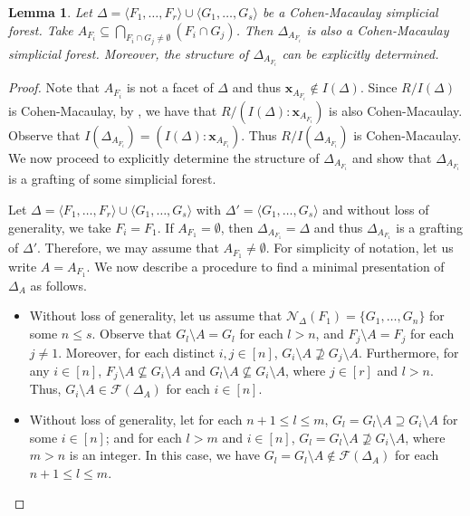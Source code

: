 \documentclass[12pt,a4paper,reqno]{amsart}
\newtheorem{lemma}[proposition]{Lemma}
\theoremstyle{definition}
\def\D{\Delta}
\def\F{\mathcal{F}}
\def\N{\mathcal{N}}
\def\l{\langle}
\def\r{\rangle}
\def\x{\mathbf x}
\begin{document}
\begin{lemma}\label{contraction CM}
    Let $\Delta=\l F_1,\ldots,F_r\r\cup\l G_1,\ldots,G_s\r$ be a Cohen-Macaulay simplicial forest. Take $A_{F_i}\subseteq \bigcap_{F_i\cap G_j\neq\emptyset}(F_i\cap G_j)$. Then $\Delta_{A_{F_i}}$ is also a Cohen-Macaulay simplicial forest. Moreover, the structure of $\D_{A_{F_i}}$ can be explicitly determined. 
\end{lemma}
\begin{proof}
Note that $A_{F_i}$ is not a facet of $\Delta$ and thus $\x_{A_{F_i}}\notin I(\Delta)$. Since $R/I(\Delta)$ is Cohen-Macaulay, by , we have that $R/(I(\D):\x_{A_{F_i}})$ is also Cohen-Macaulay. Observe that $I(\Delta_{A_{F_i}})=(I(\D):\x_{A_{F_i}})$. Thus $R/I(\Delta_{A_{F_i}})$ is Cohen-Macaulay. We now proceed to explicitly determine the structure of $\D_{A_{F_i}}$ and show that $\D_{A_{F_i}}$ is a grafting of some simplicial forest.
     
     
     Let $\Delta=\l F_1,\ldots,F_r\r\cup\l G_1,\ldots,G_s\r$ with $\Delta'=\l  G_1,\ldots,G_s\r$ and without loss of generality, we take $F_i=F_1$. If $A_{F_1}=\emptyset$, then $\Delta_{A_{F_1}}=\Delta$ and thus $\D_{A_{F_1}}$ is a grafting of $\D'$. Therefore, we may assume that $A_{F_1}\neq \emptyset$. For simplicity of notation, let us write $A=A_{F_1}$. We now describe a procedure to find a minimal presentation of $\Delta_{A}$ as follows.\par

     \begin{itemize}
         \item[$\bullet$] Without loss of generality, let us assume that $\N_{\D}(F_1)=\{G_1,\ldots,G_n\}$ for some $n\leq s$. Observe that $G_l\setminus A=G_l$ for each $l>n$, and $F_j\setminus A=F_j$ for each $j\neq 1$. Moreover, for each distinct $i,j\in [n]$, $G_i\setminus A\nsupseteq G_j\setminus A$. Furthermore, for any $i\in [n]$, $F_j\setminus A\nsubseteq G_i\setminus A$ and $G_l\setminus A\nsubseteq G_i\setminus A$, where $j\in[r]$ and $l>n$. Thus, $G_i\setminus A\in\F(\Delta_{A})$ for each $i\in[n]$. 
         
         \item[$\bullet$] Without loss of generality, let for each $n+1\le l\le m$, $G_l=G_l\setminus A\supseteq G_i\setminus A$ for some $i\in [n]$; and for each $l>m$ and $i\in [n]$, $G_l=G_l\setminus A\nsupseteq G_i\setminus A$, where $m>n$ is an integer. In this case, we have $G_l=G_l\setminus A\notin\F(\Delta_{A})$ for each $n+1\le l\le m$.


\end{itemize}
\end{proof}
\end{document}
